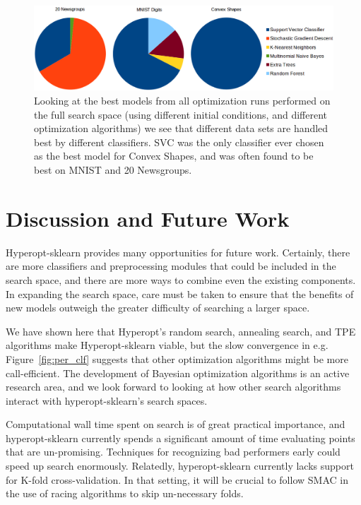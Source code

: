 \documentclass[wcp]{jmlr}
\begin{document}
\begin{figure}
    \centering
    \includegraphics[width=\textwidth]{graphics/pie}
    \caption{Looking at the best models from all optimization runs performed on the full search space (using different initial conditions, and different optimization algorithms)
             we see that different data sets are handled best by different classifiers.
             SVC was the only classifier ever chosen as the best model for Convex Shapes, and was often found to be best on MNIST and 20 Newsgroups.
         }
    \label{fig:npie}
\end{figure}



\section{Discussion and Future Work}
Hyperopt-sklearn provides many opportunities for future work.
Certainly, there are more classifiers and preprocessing modules that could be included in the search space,
and there are more ways to combine even the existing components.
In expanding the search space, care must be taken to ensure that the benefits of new models outweigh the greater difficulty of searching a larger space.

We have shown here that Hyperopt's random search, annealing search, and TPE algorithms make Hyperopt-sklearn viable, but the slow convergence in e.g. Figure~\ref{fig:per_clf} suggests
that other optimization algorithms might be more call-efficient.
The development of Bayesian optimization algorithms is an active research area, and  we look forward to looking at how other search algorithms interact with hyperopt-sklearn's search spaces.

Computational wall time spent on search is of great practical importance, and hyperopt-sklearn currently spends a significant amount of time evaluating points that are un-promising.
Techniques for recognizing bad performers early could speed up search enormously.
Relatedly, hyperopt-sklearn currently lacks support for K-fold cross-validation. In that setting, it will be crucial to follow SMAC in the use of racing algorithms to skip un-necessary folds.
\end{document}
